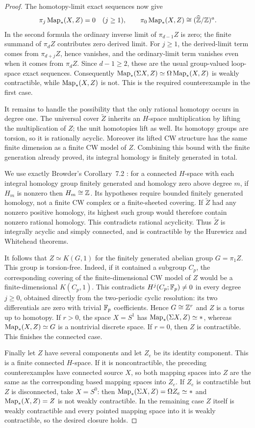 \begin{proof}
The homotopy-limit exact sequences now give
\[
 \pi_j\operatorname{Map}_*(X,Z)=0\quad(j\geq1),\qquad
 \pi_0\operatorname{Map}_*(X,Z)\cong(\widehat{\mathbb Z}/\mathbb Z)^a.
\]
In the second formula the ordinary inverse limit of
$\pi_{d-1}Z$ is zero; the finite summand of $\pi_dZ$ contributes
zero derived limit. For $j\geq1$, the derived-limit term comes
from $\pi_{d+j}Z$, hence vanishes, and the ordinary-limit term
vanishes even when it comes from $\pi_dZ$. Since $d-1\geq2$,
these are the usual group-valued loop-space exact sequences.
Consequently $\operatorname{Map}_*(\Sigma X,Z)\simeq
\Omega\operatorname{Map}_*(X,Z)$ is weakly contractible, while
$\operatorname{Map}_*(X,Z)$ is not. This is the required counterexample in
the first case.

It remains to handle the possibility that the only rational
homotopy occurs in degree one. The universal cover $\widetilde Z$
inherits an $H$-space multiplication by lifting the multiplication
of $Z$; the unit homotopies lift as well. Its homotopy groups are
torsion, so it is rationally acyclic. Moreover its lifted CW
structure has the same finite dimension as a finite CW model of
$Z$. Combining this bound with the finite generation already
proved, its integral homology is finitely generated in total.

We use exactly Browder's Corollary~7.2
\cite[p.~47]{I_Browder1961}: for a connected $H$-space with each
integral homology group finitely generated and homology zero
above degree $m$, if $H_m$ is nonzero then $H_m\cong\mathbb Z$.
Its hypotheses require bounded finitely generated homology,
not a finite CW complex or a finite-sheeted covering.
If $\widetilde Z$ had any nonzero positive homology, its highest
such group would therefore contain nonzero rational homology.
This contradicts rational acyclicity. Thus $\widetilde Z$ is
integrally acyclic and simply connected, and is contractible by
the Hurewicz and Whitehead theorems.

It follows that $Z\simeq K(G,1)$ for the finitely generated
abelian group $G=\pi_1Z$. This group is torsion-free. Indeed,
if it contained a subgroup $C_p$, the corresponding covering
of the finite-dimensional CW model of $Z$ would be a
finite-dimensional $K(C_p,1)$. This contradicts
$H^j(C_p;\mathbb F_p)\ne0$ in every degree $j\geq0$, obtained directly
from the two-periodic cyclic resolution: its two differentials
are zero with trivial $\mathbb F_p$ coefficients. Hence
$G\cong\mathbb Z^r$ and $Z$ is a torus up to homotopy.
If $r>0$, the space $X=S^1$ has
$\operatorname{Map}_*(\Sigma X,Z)\simeq *$, whereas
$\operatorname{Map}_*(X,Z)\simeq G$ is a nontrivial discrete space.
If $r=0$, then $Z$ is contractible. This finishes the connected
case.

Finally let $Z$ have several components and let $Z_e$ be its
identity component. This is a finite connected $H$-space.
If it is noncontractible, the preceding counterexamples have
connected source $X$, so both mapping spaces into $Z$ are the
same as the corresponding based mapping spaces into $Z_e$.
If $Z_e$ is contractible but $Z$ is disconnected, take $X=S^0$:
then $\operatorname{Map}_*(\Sigma X,Z)=\Omega Z_e\simeq *$ and
$\operatorname{Map}_*(X,Z)=Z$ is not weakly contractible. In the remaining
case $Z$ itself is weakly contractible and every pointed mapping
space into it is weakly contractible, so the desired closure
holds.
\end{proof}
